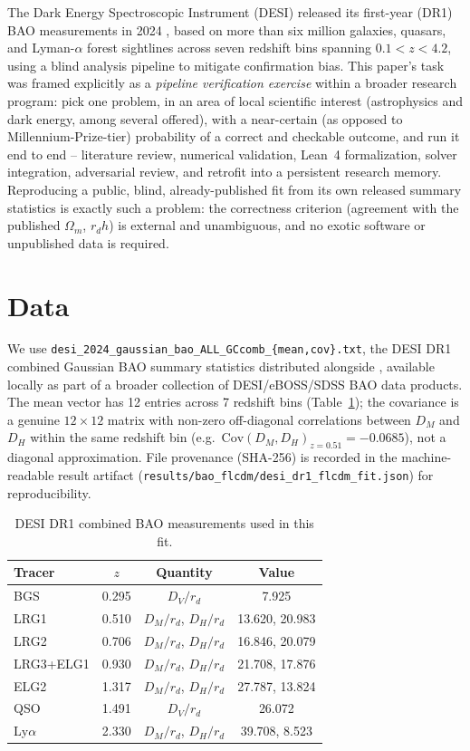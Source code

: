 \documentclass[11pt]{article}
\begin{document}
The Dark Energy Spectroscopic Instrument (DESI) released its first-year
(DR1) BAO measurements in 2024 \cite{desi2024vi}, based on more than six
million galaxies, quasars, and Lyman-$\alpha$ forest sightlines across seven
redshift bins spanning $0.1<z<4.2$, using a blind analysis pipeline to
mitigate confirmation bias. This paper's task was framed explicitly as a
\emph{pipeline verification exercise} within a broader research program: pick
one problem, in an area of local scientific interest (astrophysics and dark
energy, among several offered), with a near-certain (as opposed to
Millennium-Prize-tier) probability of a correct and checkable outcome, and
run it end to end -- literature review, numerical validation, Lean~4
formalization, solver integration, adversarial review, and retrofit into a
persistent research memory. Reproducing a public, blind, already-published
fit from its own released summary statistics is exactly such a problem: the
correctness criterion (agreement with the published $\Omega_m$, $r_d h$) is
external and unambiguous, and no exotic software or unpublished data is
required.

\section{Data}

We use \texttt{desi\_2024\_gaussian\_bao\_ALL\_GCcomb\_\{mean,cov\}.txt}, the
DESI DR1 combined Gaussian BAO summary statistics distributed alongside
\cite{desi2024vi}, available locally as part of a broader collection of
DESI/eBOSS/SDSS BAO data products. The mean vector has 12 entries across
7 redshift bins (Table~\ref{tab:data}); the covariance is a genuine
$12\times12$ matrix with non-zero off-diagonal correlations between $D_M$
and $D_H$ within the same redshift bin (e.g.\ $\mathrm{Cov}(D_M,D_H)_{z=0.51}
= -0.0685$), not a diagonal approximation. File provenance (SHA-256) is
recorded in the machine-readable result artifact
(\texttt{results/bao\_flcdm/desi\_dr1\_flcdm\_fit.json}) for reproducibility.

\begin{table}[h]
\centering
\caption{DESI DR1 combined BAO measurements used in this fit.}
\label{tab:data}
\begin{tabular}{lccc}
\toprule
Tracer & $z$ & Quantity & Value \\
\midrule
BGS      & 0.295 & $D_V/r_d$ & 7.925 \\
LRG1     & 0.510 & $D_M/r_d$, $D_H/r_d$ & 13.620, 20.983 \\
LRG2     & 0.706 & $D_M/r_d$, $D_H/r_d$ & 16.846, 20.079 \\
LRG3+ELG1& 0.930 & $D_M/r_d$, $D_H/r_d$ & 21.708, 17.876 \\
ELG2     & 1.317 & $D_M/r_d$, $D_H/r_d$ & 27.787, 13.824 \\
QSO      & 1.491 & $D_V/r_d$ & 26.072 \\
Ly$\alpha$ & 2.330 & $D_M/r_d$, $D_H/r_d$ & 39.708, 8.523 \\
\bottomrule
\end{tabular}
\end{table}
\end{document}
